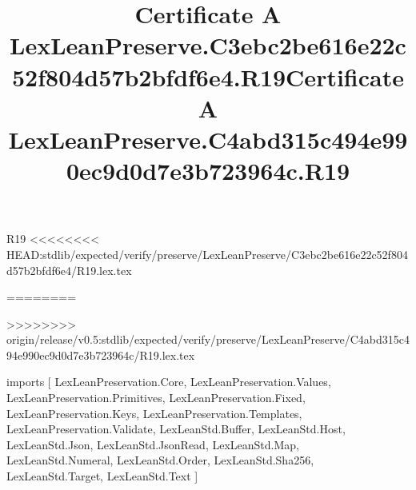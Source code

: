 \begin{lexlean}{R19}
<<<<<<<< HEAD:stdlib/expected/verify/preserve/LexLeanPreserve/C3ebc2be616e22c52f804d57b2bfdf6e4/R19.lex.tex
\title{Certificate A LexLeanPreserve.C3ebc2be616e22c52f804d57b2bfdf6e4.R19}
========
\title{Certificate A LexLeanPreserve.C4abd315c494e990ec9d0d7e3b723964c.R19}
>>>>>>>> origin/release/v0.5:stdlib/expected/verify/preserve/LexLeanPreserve/C4abd315c494e990ec9d0d7e3b723964c/R19.lex.tex
\begin{coremodule}
imports [
  LexLeanPreservation.Core,
  LexLeanPreservation.Values,
  LexLeanPreservation.Primitives,
  LexLeanPreservation.Fixed,
  LexLeanPreservation.Keys,
  LexLeanPreservation.Templates,
  LexLeanPreservation.Validate,
  LexLeanStd.Buffer,
  LexLeanStd.Host,
  LexLeanStd.Json,
  LexLeanStd.JsonRead,
  LexLeanStd.Map,
  LexLeanStd.Numeral,
  LexLeanStd.Order,
  LexLeanStd.Sha256,
  LexLeanStd.Target,
  LexLeanStd.Text
]


\end{coremodule}
\end{lexlean}
